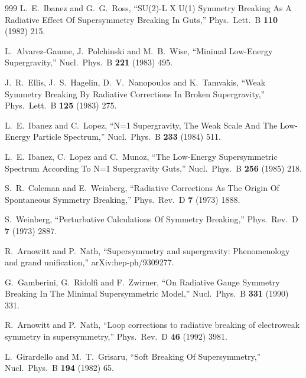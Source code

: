 \begin{thebibliography}{999}
  L.~E.~Ibanez and G.~G.~Ross,
  ``SU(2)-L X U(1) Symmetry Breaking As A Radiative Effect Of Supersymmetry
  Breaking In Guts,''
  Phys.\ Lett.\ B {\bf 110} (1982) 215.

  L.~Alvarez-Gaume, J.~Polchinski and M.~B.~Wise,
  ``Minimal Low-Energy Supergravity,''
  Nucl.\ Phys.\ B {\bf 221} (1983) 495.

  J.~R.~Ellis, J.~S.~Hagelin, D.~V.~Nanopoulos and K.~Tamvakis,
  ``Weak Symmetry Breaking By Radiative Corrections In Broken Supergravity,''
  Phys.\ Lett.\ B {\bf 125} (1983) 275.

  L.~E.~Ibanez and C.~Lopez,
  ``N=1 Supergravity, The Weak Scale And The Low-Energy Particle Spectrum,''
  Nucl.\ Phys.\ B {\bf 233} (1984) 511.

  L.~E.~Ibanez, C.~Lopez and C.~Munoz,
  ``The Low-Energy Supersymmetric Spectrum According To N=1 Supergravity
  Guts,''
  Nucl.\ Phys.\ B {\bf 256} (1985) 218.

  S.~R.~Coleman and E.~Weinberg,
  ``Radiative Corrections As The Origin Of Spontaneous Symmetry Breaking,''
  Phys.\ Rev.\ D {\bf 7} (1973) 1888.

  S.~Weinberg,
  ``Perturbative Calculations Of Symmetry Breaking,''
  Phys.\ Rev.\ D {\bf 7} (1973) 2887.

R.~Arnowitt and P.~Nath,
  ``Supersymmetry and supergravity: Phenomenology and grand unification,''
  arXiv:hep-ph/9309277.

  G.~Gamberini, G.~Ridolfi and F.~Zwirner,
  ``On Radiative Gauge Symmetry Breaking In The Minimal Supersymmetric Model,''
  Nucl.\ Phys.\ B {\bf 331} (1990) 331.

  R.~Arnowitt and P.~Nath,
  ``Loop corrections to radiative breaking of electroweak symmetry in
  supersymmetry,''
  Phys.\ Rev.\ D {\bf 46} (1992) 3981.

  L.~Girardello and M.~T.~Grisaru,
  ``Soft Breaking Of Supersymmetry,''
  Nucl.\ Phys.\ B {\bf 194} (1982) 65.


\end{thebibliography}
